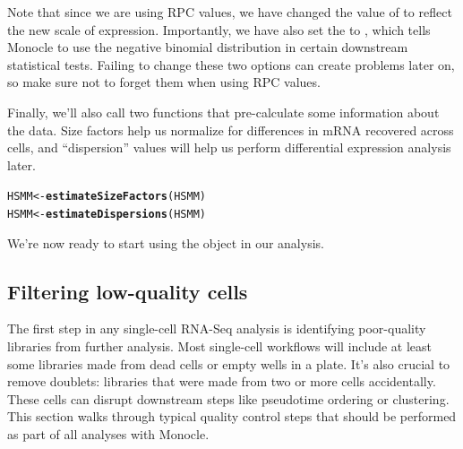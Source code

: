 \documentclass[10pt,oneside]{article}\usepackage[]{graphicx}\usepackage[]{color}
\makeatletter
\newcommand{\hlstd}[1]{\textcolor[rgb]{0.345,0.345,0.345}{#1}}%
\newcommand{\hlkwb}[1]{\textcolor[rgb]{0.69,0.353,0.396}{#1}}%
\newcommand{\hlkwd}[1]{\textcolor[rgb]{0.737,0.353,0.396}{\textbf{#1}}}%
\newenvironment{kframe}{%
 \def\at@end@of@kframe{}%
 \ifinner\ifhmode%
  \def\at@end@of@kframe{\end{minipage}}%
  \begin{minipage}{\columnwidth}%
 \fi\fi%
 \def\FrameCommand##1{\hskip\@totalleftmargin \hskip-\fboxsep
 \colorbox{shadecolor}{##1}\hskip-\fboxsep
     \hskip-\linewidth \hskip-\@totalleftmargin \hskip\columnwidth}%
 \MakeFramed {\advance\hsize-\width
   \@totalleftmargin\z@ \linewidth\hsize
   \@setminipage}}%
 {\par\unskip\endMakeFramed%
 \at@end@of@kframe}
\newenvironment{knitrout}{}{} %
\makeatother
\begin{document}
 Note that since we are using RPC values, we have changed the value of  to reflect the new scale of expression. Importantly, we have also set the  to , which tells Monocle to use the negative binomial distribution in certain downstream statistical tests. Failing to change these two options can create problems later on, so make sure not to forget them when using RPC values.
 
 
 Finally, we'll also call two functions that pre-calculate some information about the data. Size factors help us normalize for differences in mRNA recovered across cells, and ``dispersion'' values will help us perform differential expression analysis later.
\begin{knitrout}
\color{fgcolor}\begin{kframe}
\begin{alltt}
\hlstd{HSMM} \hlkwb{<-} \hlkwd{estimateSizeFactors}\hlstd{(HSMM)}
\hlstd{HSMM} \hlkwb{<-} \hlkwd{estimateDispersions}\hlstd{(HSMM)}
\end{alltt}


{\ttfamily\noindent\itshape\color{messagecolor}{\#\# Removing 139 outliers}}\end{kframe}
\end{knitrout}
 
 
 We're now ready to start using the  object in our analysis.
 
 \subsection{Filtering low-quality cells}
 The first step in any single-cell RNA-Seq analysis is identifying poor-quality libraries from further analysis. Most single-cell workflows will include at least some libraries made from dead cells or empty wells in a plate. It's also crucial to remove doublets: libraries that were made from two or more cells accidentally. These cells can disrupt downstream steps like pseudotime ordering or clustering. This section walks through typical quality control steps that should be performed as part of all analyses with Monocle.
 
\end{document}
